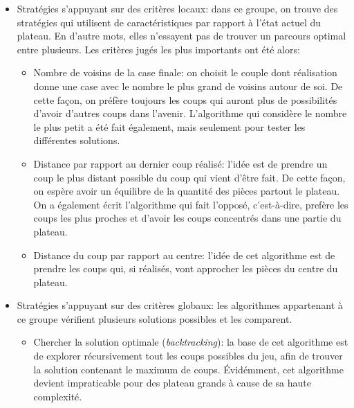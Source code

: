 \documentclass{article}
\begin{document}
\begin{itemize}

  \item Stratégies s'appuyant sur des critères locaux: dans ce groupe, on trouve
  des stratégies qui utilisent de caractéristiques par rapport à l'état actuel
  du plateau. En d'autre mots, elles n'essayent pas de trouver un parcours
  optimal entre plusieurs. Les critères jugés les plus importants ont été alors:

  \vspace{12pt}
  \begin {itemize}
  
	  \item Nombre de voisins de la case finale: on choisit le couple dont
	  réalisation donne une case avec le nombre le plus grand de
	  voisins autour de soi. De cette façon, on préfère toujours les coups qui
	  auront plus de possibilités d'avoir d'autres coups dans l'avenir.
	  L'algorithme qui considère le nombre le plus petit a été fait également, mais
	  seulement pour tester les différentes solutions.
  	  
  	  \vspace{12pt}
  	  
  	  \item Distance par rapport au dernier coup réalisé: l'idée est de
  	  prendre un coup le plus distant possible du coup qui vient d'être fait. De cette
  	  façon, on espère avoir un équilibre de la quantité des pièces partout le
  	  plateau. On a également écrit l'algorithme qui fait l'opposé, c'est-à-dire,
  	  prefère les coups les plus proches et d'avoir les coups concentrés dans une
  	  partie du plateau.
  	  
  	  \vspace{12pt}
  	  
  	  \item Distance du coup par rapport au centre: l'idée de cet algorithme est
  	  de prendre les coups qui, si réalisés, vont approcher les pièces du centre
  	  du plateau. 
  \end {itemize}
  
  \vspace{12pt}
  
  \item Stratégies s'appuyant sur des critères globaux: les algorithmes
  appartenant à ce groupe vérifient plusieurs solutions possibles et les
  comparent.
  
  \vspace{12pt}
  \begin {itemize}
    \item Chercher la solution optimale (\textit{backtracking}): la base de cet
    algorithme est de explorer récursivement tout les coups possibles du jeu,
    afin de trouver la solution contenant le maximum de coups. Évidémment, cet
    algorithme devient impraticable pour des plateau grands à cause de sa
    haute complexité.
    

\end{itemize}
\end{itemize}
\end{document}
